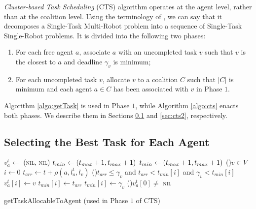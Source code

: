 \emph{Cluster-based Task Scheduling} (CTS) algorithm operates at the agent level, rather
than at the coalition level. Using the terminology of \cite{gerkey2004}, we can say that
it decomposes a Single-Task Multi-Robot problem into a sequence of Single-Task
Single-Robot problems. It is divided into the following two phases:
\begin{enumerate}
    \item For each free agent $a$, associate $a$ with an uncompleted task $v$ such that
        $v$ is the closest to $a$ and deadline $\gamma_v$ is minimum;
    \item For each uncompleted task $v$, allocate $v$ to a coalition $C$ such that $|C|$
        is minimum and each agent $a \in C$ has been associated with $v$ in Phase $1$.
\end{enumerate}
Algorithm \ref{algo:getTask} is used in Phase $1$, while Algorithm \ref{algo:cts} enacts
both phases. We describe them in Sections \ref{sec:getTask} and
\ref{sec:cts2}, respectively.

\subsection{Selecting the Best Task for Each Agent}\label{sec:getTask}

\begin{algorithm}[t]
    \DontPrintSemicolon
    $v_a^t \gets $ (\textsc{nil}, \textsc{nil}) \;
    $t_{min} \gets (t_{max} + 1, t_{max} + 1)$ \;
    $t_{min} \gets (t_{max} + 1, t_{max} + 1)$ \;
    \For(){$v \in V$}{
        $i \gets 0$ \;
        $t_{arr} \gets t + \rho(a, l_a^t, l_v)$\;
        \If(){\normalfont $t_{arr} \leq \gamma_v$ and $t_{arr} < t_{min}[i]$ and $\gamma_v < t_{min}[i]$}{
            $v_a^t[i] \gets v$\;
            $t_{min}[i] \gets t_{arr}$\;
            $t_{min}[i] \gets \gamma_v$\;
        }
    }
    \If(){$v^t_a[0] \neq$
        \textsc{\normalfont nil}}{
        \;
    }
    \;
    \caption{\textsf{getTaskAllocableToAgent} (used in Phase $1$ of CTS)\label{algo:getTask}}
\end{algorithm}

